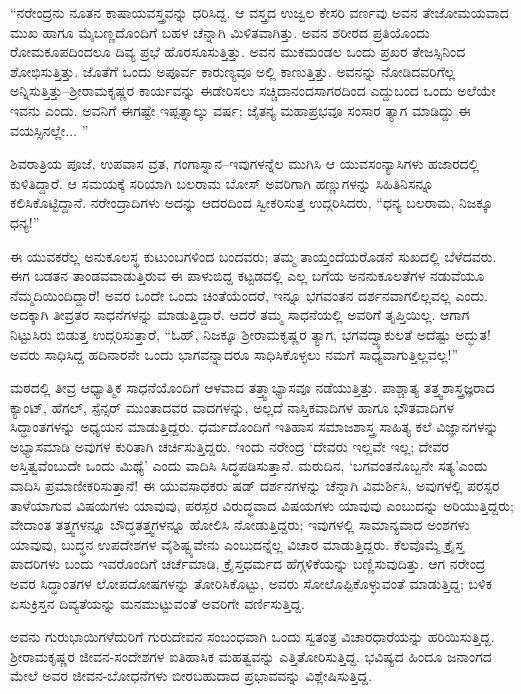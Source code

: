 “ನರೇಂದ್ರನು ನೂತನ ಕಾಷಾಯವಸ್ತ್ರವನ್ನು ಧರಿಸಿದ್ದ. ಆ ವಸ್ತ್ರದ ಉಜ್ವಲ ಕೇಸರಿ ವರ್ಣವು ಅವನ ತೇಜೋಮಯವಾದ ಮುಖ ಹಾಗೂ ಮೈಬಣ್ಣದೊಂದಿಗೆ ಬಹಳ ಚೆನ್ನಾಗಿ ಮಿಳಿತವಾಗಿತ್ತು. ಅವನ ಶರೀರದ ಪ್ರತಿಯೊಂದು ರೋಮಕೂಪದಿಂದಲೂ ದಿವ್ಯ ಪ್ರಭೆ ಹೊರಸೂಸುತ್ತಿತ್ತು. ಅವನ ಮುಕಮಂಡಲ ಒಂದು ಪ್ರಖರ ತೇಜಸ್ಸಿನಿಂದ ಶೋಭಿಸುತ್ತಿತ್ತು. ಜೊತೆಗೆ ಒಂದು ಅಪೂರ್ವ ಕಾರುಣ್ಯವೂ ಅಲ್ಲಿ ಕಾಣುತ್ತಿತ್ತು. ಅವನನ್ನು ನೋಡಿದವರಿಗೆಲ್ಲ ಅನ್ನಿಸುತ್ತಿತ್ತು–ಶ್ರೀರಾಮಕೃಷ್ಣರ ಕಾರ್ಯವನ್ನು ಈಡೇರಿಸಲು ಸಚ್ಚಿದಾನಂದಸಾಗರದಿಂದ ಎದ್ದುಬಂದ ಒಂದು ಅಲೆಯೇ ಇವನು ಎಂದು. ಅವನಿಗೆ ಈಗಷ್ಟೇ ಇಪ್ಪತ್ನಾಲ್ಕು ವರ್ಷ; ಜೈತನ್ಯ ಮಹಾಪ್ರಭವೂ ಸಂಸಾರ ತ್ಯಾಗ ಮಾಡಿದ್ದು ಈ ವಯಸ್ಸಿನಲ್ಲೇ... ”

ಶಿವರಾತ್ರಿಯ ಪೂಜೆ, ಉಪವಾಸ ವ್ರತ, ಗಂಗಾಸ್ನಾನ–ಇವುಗಳನ್ನೆಲ ಮುಗಿಸಿ ಆ ಯುವಸಂನ್ಯಾಸಿಗಳು ಹಜಾರದಲ್ಲಿ ಕುಳಿತಿದ್ದಾರೆ. ಆ ಸಮಯಕ್ಕೆ ಸರಿಯಾಗಿ ಬಲರಾಮ ಬೋಸ್ ಅವರಿಗಾಗಿ ಹಣ್ಣುಗಳನ್ನು ಸಿಹಿತಿನಿಸನ್ನೂ ಕಲಿಸಿಕೊಟ್ಟಿದ್ದಾನೆ. ನರೇಂದ್ರಾದಿಗಳು ಅದನ್ನು ಆದರದಿಂದ ಸ್ವೀಕರಿಸುತ್ತ ಉದ್ಗರಿಸಿದರು, “ಧನ್ಯ ಬಲರಾಮ, ನಿಜಕ್ಕೂ ಧನ್ಯ!”

\delimiter

ಈ ಯುವಕರೆಲ್ಲ ಅನುಕೂಲಸ್ಥ ಕುಟುಂಬಗಳಿಂದ ಬಂದವರು; ತಮ್ಮ ತಾಯ್ತಂದೆಯರೊಡನೆ ಸುಖದಲ್ಲಿ ಬೆಳೆದವರು. ಈಗ ಬಡತನ ತಾಂಡವವಾಡುತ್ತಿರುವ ಈ ಪಾಳುಬಿದ್ದ ಕಟ್ಟಡದಲ್ಲಿ ಎಲ್ಲ ಬಗೆಯ ಅನನುಕೂಲತೆಗಳ ನಡುವೆಯೂ ನೆಮ್ಮದಿಯಿಂದಿದ್ದಾರೆ! ಅವರ ಒಂದೇ ಒಂದು ಚಿಂತೆಯೆಂದರೆ, ಇನ್ನೂ ಭಗವಂತನ ದರ್ಶನವಾಗಲಿಲ್ಲವಲ್ಲ ಎಂದು. ಅದಕ್ಕಾಗಿ ತೀವ್ರತರ ಸಾಧನೆಗಳನ್ನು ಮಾಡುತ್ತಿದ್ದಾರೆ. ಆದರೆ ತಮ್ಮ ಸಾಧನೆಯಲ್ಲಿ ಅವರಿಗೆ ತೃಪ್ತಿಯಿಲ್ಲ. ಆಗಾಗ ನಿಟ್ಟುಸಿರು ಬಿಡುತ್ತ ಉದ್ಗರಿಸುತ್ತಾರೆ, “ಓಹ್, ನಿಜಕ್ಕೂ ಶ್ರೀರಾಮಕೃಷ್ಣರ ತ್ಯಾಗ, ಭಗವದ್ವ್ಯಾಕುಲತೆ ಅದೆಷ್ಟು ಅದ್ಭುತ! ಅವರು ಸಾಧಿಸಿದ್ದ ಹದಿನಾರನೇ ಒಂದು ಭಾಗವನ್ನಾದರೂ ಸಾಧಿಸಿಕೊಳ್ಳಲು ನಮಗೆ ಸಾಧ್ಯವಾಗುತ್ತಿಲ್ಲವಲ್ಲ!”

ಮಠದಲ್ಲಿ ತೀವ್ರ ಆಧ್ಯಾತ್ಮಿಕ ಸಾಧನೆಯೊಂದಿಗೆ ಆಳವಾದ ತತ್ತ್ವಾಭ್ಯಾಸವೂ ನಡೆಯುತ್ತಿತ್ತು. ಪಾಶ್ಚಾತ್ಯ ತತ್ತ್ವಶಾಸ್ತ್ರಜ್ಞರಾದ ಕ್ಯಾಂಟ್, ಹೆಗಲ್, ಸ್ಪೆನ್ಸರ್ ಮುಂತಾದವರ ವಾದಗಳನ್ನು, ಅಲ್ಲದೆ ನಾಸ್ತಿಕವಾದಿಗಳ ಹಾಗೂ ಭೌತವಾದಿಗಳ ಸಿದ್ಧಾಂತಗಳನ್ನು ಅಧ್ಯಯನ ಮಾಡುತ್ತಿದ್ದರು. ಧರ್ಮದೊಂದಿಗೆ ಇತಿಹಾಸ ಸಮಾಜಶಾಸ್ತ್ರ ಸಾಹಿತ್ಯ ಕಲೆ ವಿಜ್ಞಾನಗಳನ್ನು ಅಭ್ಯಾಸಮಾಡಿ ಅವುಗಳ ಕುರಿತಾಗಿ ಚರ್ಚಿಸುತ್ತಿದ್ದರು. ಇಂದು ನರೇಂದ್ರ ‘ದೇವರು ಇಲ್ಲವೇ ಇಲ್ಲ; ದೇವರ ಅಸ್ತಿತ್ವವೆಂಬುದೇ ಒಂದು ಮಿಥ್ಯೆ’ ಎಂದು ವಾದಿಸಿ ಸಿದ್ಧಪಡಿಸುತ್ತಾನೆ. ಮರುದಿನ, ‘ಬಗವಂತನೊಬ್ಬನೇ ಸತ್ಯ’ಎಂದು ವಾದಿಸಿ ಪ್ರಮಾಣೀಕರಿಸುತ್ತಾನೆ! ಈ ಯುವಸಾಧಕರು ಷಡ್ ದರ್ಶನಗಳನ್ನು ಚೆನ್ನಾಗಿ ವಿಮರ್ಶಿಸಿ, ಅವುಗಳಲ್ಲಿ ಪರಸ್ಪರ ತಾಳೆಯಾಗುವ ವಿಷಯಗಳು ಯಾವುವು, ಪರಸ್ಪರ ವಿರುದ್ಧವಾದ ವಿಷಯಗಳು ಯಾವುವು ಎಂಬುದನ್ನು ಅರಿಯುತ್ತಿದ್ದರು; ವೇದಾಂತ ತತ್ತ್ವಗಳನ್ನೂ ಬೌದ್ಧತತ್ತ್ವಗಳನ್ನೂ ಹೋಲಿಸಿ ನೋಡುತ್ತಿದ್ದರು; ಇವುಗಳಲ್ಲಿ ಸಾಮಾನ್ಯವಾದ ಅಂಶಗಳು ಯಾವುವು, ಬುದ್ಧನ ಉಪದೇಶಗಳ ವೈಶಿಷ್ಟ್ಯವೇನು ಎಂಬುದನ್ನೆಲ್ಲ ವಿಚಾರ ಮಾಡುತ್ತಿದ್ದರು. ಕೆಲವೊಮ್ಮೆ ಕ್ರೈಸ್ತ ಪಾದರಿಗಳು ಬಂದು ಇವರೊಂದಿಗೆ ಚರ್ಚೆಮಾಡಿ, ಕ್ರೈಸ್ತಧರ್ಮದ ಹೆಗ್ಗಳಿಕೆಯನ್ನು ಬಣ್ಣಿಸುವುದಿತ್ತು. ಆಗ ನರೇಂದ್ರ ಅವರ ಸಿದ್ಧಾಂತಗಳ ಲೋಪದೋಷಗಳನ್ನು ತೋರಿಸಿಕೊಟ್ಟು, ಅವರು ಸೋಲೊಪ್ಪಿಕೊಳ್ಳುವಂತೆ ಮಾಡುತ್ತಿದ್ದ; ಬಳಿಕ ಏಸುಕ್ರಿಸ್ತನ ದಿವ್ಯತೆಯನ್ನು ಮನಮುಟ್ಟುವಂತೆ ಅವರಿಗೇ ವರ್ಣಿಸುತ್ತಿದ್ದ.

ಅವನು ಗುರುಭಾಯಿಗಳೆದುರಿಗೆ ಗುರುದೇವನ ಸಂಬಂಧವಾಗಿ ಒಂದು ಸ್ವತಂತ್ರ ವಿಚಾರಧಾರೆಯನ್ನು ಹರಿಯಿಸುತ್ತಿದ್ದ. ಶ್ರೀರಾಮಕೃಷ್ಣರ ಜೀವನ-ಸಂದೇಶಗಳ ಐತಿಹಾಸಿಕ ಮಹತ್ವವನ್ನು ಎತ್ತಿತೋರಿಸುತ್ತಿದ್ದ. ಭವಿಷ್ಯದ ಹಿಂದೂ ಜನಾಂಗದ ಮೇಲೆ ಅವರ ಜೀವನ-ಬೋಧನೆಗಳು ಬೀರಬಹುದಾದ ಪ್ರಭಾವವನ್ನು ವಿಶ್ಲೇಷಿಸುತ್ತಿದ್ದ.


